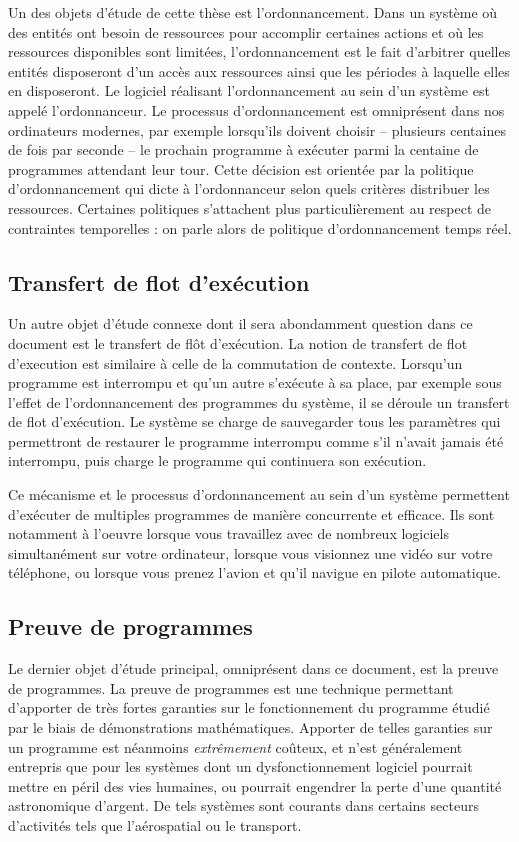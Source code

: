 Un des objets d'étude de cette thèse est l'ordonnancement. Dans un système où des entités ont besoin de ressources pour accomplir certaines actions et où les ressources disponibles sont limitées, l'ordonnancement est le fait d'arbitrer quelles entités disposeront d'un accès aux ressources ainsi que les périodes à laquelle elles en disposeront. Le logiciel réalisant l'ordonnancement au sein d'un système est appelé l'ordonnanceur. Le processus d'ordonnancement est omniprésent dans nos ordinateurs modernes, par exemple lorsqu'ils doivent choisir -- plusieurs centaines de fois par seconde -- le prochain programme à exécuter parmi la centaine de programmes attendant leur tour. Cette décision est orientée par la politique d'ordonnancement qui dicte à l'ordonnanceur selon quels critères distribuer les ressources. Certaines politiques s'attachent plus particulièrement au respect de contraintes temporelles : on parle alors de politique d'ordonnancement temps réel.

\subsection{Transfert de flot d'exécution}

Un autre objet d'étude connexe dont il sera abondamment question dans ce document est le transfert de flôt d'exécution. La notion de transfert de flot d'execution est similaire à celle de la commutation de contexte. Lorsqu'un programme est interrompu et qu'un autre s'exécute à sa place, par exemple sous l'effet de l'ordonnancement des programmes du système, il se déroule un transfert de flot d'exécution. Le système se charge de sauvegarder tous les paramètres qui permettront de restaurer le programme interrompu comme s'il n'avait jamais été interrompu, puis charge le programme qui continuera son exécution.

Ce mécanisme et le processus d'ordonnancement au sein d'un système permettent d'exécuter de multiples programmes de manière concurrente et efficace. Ils sont notamment à l'oeuvre lorsque vous travaillez avec de nombreux logiciels simultanément sur votre ordinateur, lorsque vous visionnez une vidéo sur votre téléphone, ou lorsque vous prenez l'avion et qu'il navigue en pilote automatique.

\subsection{Preuve de programmes}

Le dernier objet d'étude principal, omniprésent dans ce document, est la preuve de programmes. La preuve de programmes est une technique permettant d'apporter de très fortes garanties sur le fonctionnement du programme étudié par le biais de démonstrations mathématiques. Apporter de telles garanties sur un programme est néanmoins \emph{extrêmement} coûteux, et n'est généralement entrepris que pour les systèmes dont un dysfonctionnement logiciel pourrait mettre en péril des vies humaines, ou pourrait engendrer la perte d'une quantité astronomique d'argent. De tels systèmes sont courants dans certains secteurs d'activités tels que l'aérospatial ou le transport.


